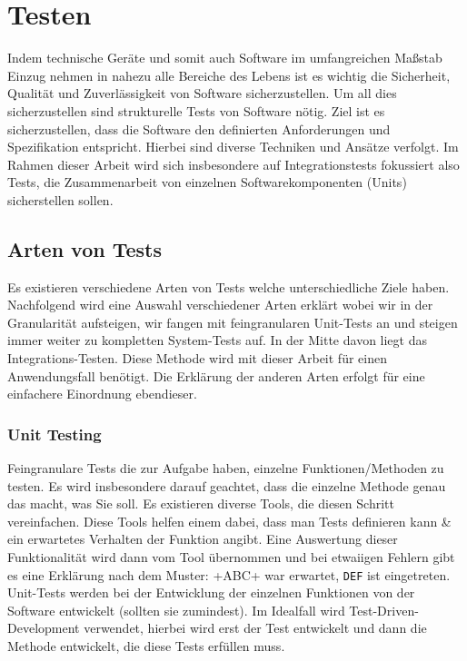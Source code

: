 \section{Testen}

Indem technische Geräte und somit auch Software im umfangreichen Maßstab Einzug nehmen in nahezu alle Bereiche des
Lebens ist es wichtig die Sicherheit, Qualität und Zuverlässigkeit von Software sicherzustellen.
Um all dies sicherzustellen sind strukturelle Tests von Software nötig.
Ziel ist es sicherzustellen, dass die Software den definierten Anforderungen und Spezifikation entspricht.
Hierbei sind diverse Techniken und Ansätze verfolgt.
Im Rahmen dieser Arbeit wird sich insbesondere auf Integrationstests fokussiert also Tests, die Zusammenarbeit von einzelnen Softwarekomponenten (Units)
sicherstellen sollen.

\subsection{Arten von Tests}

Es existieren verschiedene Arten von Tests welche unterschiedliche Ziele haben.
Nachfolgend wird eine Auswahl verschiedener Arten erklärt wobei wir in der Granularität aufsteigen, wir fangen mit feingranularen Unit-Tests an
und steigen immer weiter zu kompletten System-Tests auf.
In der Mitte davon liegt das Integrations-Testen.
Diese Methode wird mit dieser Arbeit für einen Anwendungsfall benötigt.
Die Erklärung der anderen Arten erfolgt für eine einfachere Einordnung ebendieser.

\subsubsection{Unit Testing}

Feingranulare Tests die zur Aufgabe haben, einzelne Funktionen/Methoden zu testen.
Es wird insbesondere darauf geachtet, dass die einzelne Methode genau das macht, was Sie soll.
Es existieren diverse Tools, die diesen Schritt vereinfachen.
Diese Tools helfen einem dabei, dass man Tests definieren kann \& ein erwartetes Verhalten der Funktion angibt.
Eine Auswertung dieser Funktionalität wird dann vom Tool übernommen und bei etwaiigen Fehlern gibt es eine Erklärung
nach dem Muster: \vern+ABC+ war erwartet, \verb+DEF+ ist eingetreten.
Unit-Tests werden bei der Entwicklung der einzelnen Funktionen von der Software entwickelt (sollten sie zumindest).
Im Idealfall wird Test-Driven-Development verwendet, hierbei wird erst der Test entwickelt und dann die Methode entwickelt,
die diese Tests erfüllen muss.

